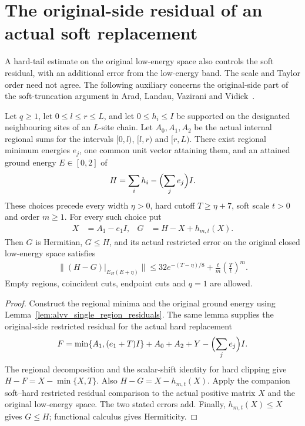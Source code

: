 \section{The original-side residual of an actual soft replacement}
\label{sec:alvv_original_soft_residual}

A hard-tail estimate on the original low-energy space also controls the
soft residual, with an additional error from the low-energy band.
The scale and Taylor order need not agree. The following auxiliary
concerns the original-side part of the soft-truncation argument in
Arad, Landau, Vazirani and Vidick~\cite[lines 1195--1255 and 1373--1420]{Arad2016RigorousRG}.

\begin{lemma}
    \label{lem:alvv_original_soft_residual}
    \leanok
    Let $q\geq1$, let $0\leq l\leq r\leq L$, and let
    $0\leq h_i\leq I$ be supported on the designated neighbouring
    sites of an $L$-site chain. Let $A_0,A_1,A_2$ be the actual internal
    regional sums for the intervals $[0,l)$, $[l,r)$ and $[r,L)$.
    There exist regional minimum energies $e_j$, one common unit vector
    attaining them, and an attained ground energy $E\in[0,2]$ of
    \begin{align}
        H=\sum_i h_i-\Bigl(\sum_j e_j\Bigr)I.
    \end{align}
    These choices precede every width $\eta>0$, hard cutoff
    $T\geq\eta+7$, soft scale $t>0$ and order $m\geq1$.
    For every such choice put
    \begin{align}
        X & =A_1-e_1I, & G & =H-X+h_{m,t}(X).
    \end{align}
    Then $G$ is Hermitian, $G\leq H$, and its actual restricted error
    on the original closed low-energy space satisfies
    \begin{align}
        \|(H-G)|_{E_H(E+\eta)}\|
        \leq 32e^{-(T-\eta)/8}
        +\frac{t}{m}\left(\frac{T}{t}\right)^m.
    \end{align}
    Empty regions, coincident cuts, endpoint cuts and $q=1$ are allowed.
\end{lemma}
\begin{proof}\leanok
    Construct the regional minima and the original ground energy using
    Lemma~\ref{lem:alvv_single_region_residuals}. The same lemma supplies
    the original-side restricted residual for the actual hard replacement
    \begin{align}
        F=\min\{A_1,(e_1+T)I\}+A_0+A_2+Y-\Bigl(\sum_j e_j\Bigr)I.
    \end{align}
    The regional decomposition and the scalar-shift identity for hard
    clipping give $H-F=X-\min\{X,T\}$. Also
    $H-G=X-h_{m,t}(X)$. Apply the companion soft--hard restricted
    residual comparison to the actual positive matrix $X$ and the
    original low-energy space. The two stated errors add.
    Finally, $h_{m,t}(X)\leq X$ gives $G\leq H$; functional calculus
    gives Hermiticity.
\end{proof}

